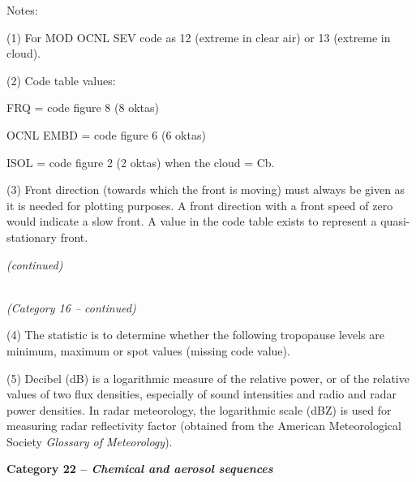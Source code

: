 Notes:

(1) For MOD OCNL SEV code as 12 (extreme in clear air) or 13 (extreme in cloud).

(2) Code table values:

FRQ = code figure 8 (8 oktas)

OCNL EMBD = code figure 6 (6 oktas)

ISOL = code figure 2 (2 oktas) when the cloud = Cb.

(3) Front direction (towards which the front is moving) must always be given as it is needed for plotting purposes. A front direction with a front speed of zero would indicate a slow front. A value in the code table exists to represent a quasi-stationary front.

\emph{(continued)}

\emph{\\
(Category 16 -- continued)}

(4) The statistic is to determine whether the following tropopause levels are minimum, maximum or spot values (missing code value).

(5) Decibel (dB) is a logarithmic measure of the relative power, or of the relative values of two flux densities, especially of sound intensities and radio and radar power densities. In radar meteorology, the logarithmic scale (dBZ) is used for measuring radar reflectivity factor (obtained from the American Meteorological Society \emph{Glossary of Meteorology}).

\textbf{Category 22 -- \emph{Chemical and aerosol sequences}}

